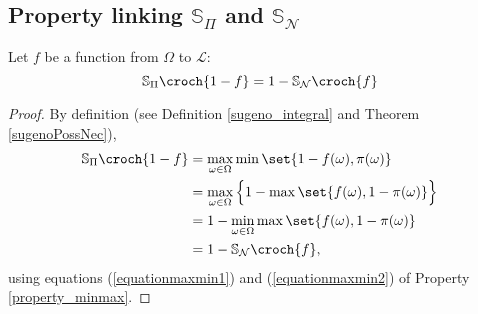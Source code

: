 \subsection{Property linking $\mathbb{S}_{\Pi}$ and $\mathbb{S}_{\mathcal{N}}$}
\begin{Property}
\label{prop_SpiSn}
Let $f$ be a function from $\Omega$ to $\mathcal{L}$:
\[ \mathbb{S}_{\Pi} \croch{1-f} = 1 - \mathbb{S}_{\mathcal{N}} \croch{ f }  \]
\end{Property}
\begin{proof}
By definition (see Definition \ref{sugeno_integral} and Theorem \ref{sugenoPossNec}),
\begin{align*}
\mathbb{S}_{\Pi} \croch{ 1 - f } &= \max_{\omega \in \Omega} \min \set{ 1 - f(\omega), \pi(\omega) } \\
&= \max_{\omega \in \Omega} \Big\{ 1 - \max \set{ f(\omega), 1 -\pi(\omega) } \Big\} \\
&= 1 - \min_{\omega \in \Omega} \max \set{ f(\omega), 1 - \pi(\omega) } \\
&= 1 - \mathbb{S}_{\mathcal{N}} \croch{f},
\end{align*}
using equations (\ref{equationmaxmin1}) and (\ref{equationmaxmin2}) of Property \ref{property_minmax}.
\end{proof}
